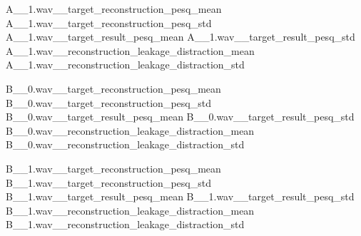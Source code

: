 \constrainingplot
{A__1.wav__target_reconstruction_pesq_mean}
{A__1.wav__target_reconstruction_pesq_std}
{A__1.wav__target_result_pesq_mean}
{A__1.wav__target_result_pesq_std}
{A__1.wav__reconstruction_leakage_distraction_mean}
{A__1.wav__reconstruction_leakage_distraction_std}

\constrainingplot
{B__0.wav__target_reconstruction_pesq_mean}
{B__0.wav__target_reconstruction_pesq_std}
{B__0.wav__target_result_pesq_mean}
{B__0.wav__target_result_pesq_std}
{B__0.wav__reconstruction_leakage_distraction_mean}
{B__0.wav__reconstruction_leakage_distraction_std}

\constrainingplot
{B__1.wav__target_reconstruction_pesq_mean}
{B__1.wav__target_reconstruction_pesq_std}
{B__1.wav__target_result_pesq_mean}
{B__1.wav__target_result_pesq_std}
{B__1.wav__reconstruction_leakage_distraction_mean}
{B__1.wav__reconstruction_leakage_distraction_std}
